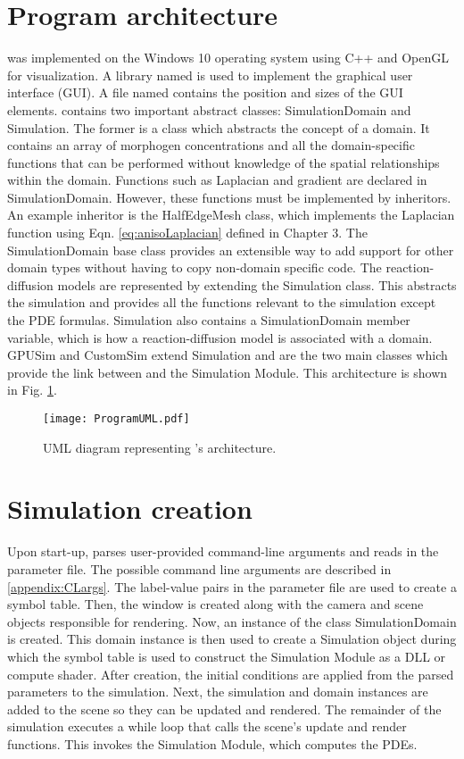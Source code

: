 \section{Program architecture} 
\ProgramName{} was implemented on the Windows 10 operating system using C++ and OpenGL for visualization. A library named  \citep{cornut2019} is used to implement the graphical user interface (GUI). A file named  contains the position and sizes of the GUI elements. \ProgramName{} contains two important abstract classes: SimulationDomain and Simulation. The former is a class which abstracts the concept of a domain. It contains an array of morphogen concentrations and all the domain-specific functions that can be performed without knowledge of the spatial relationships within the domain. Functions such as Laplacian and gradient are declared in SimulationDomain. However, these functions must be implemented by inheritors. An example inheritor is the HalfEdgeMesh class, which implements the Laplacian function using Eqn. \ref{eq:anisoLaplacian} defined in Chapter 3. The SimulationDomain base class provides an extensible way to add support for other domain types without having to copy non-domain specific code. The reaction-diffusion models are represented by extending the Simulation class. This abstracts the simulation and provides all the functions relevant to the simulation except the PDE formulas. Simulation also contains a SimulationDomain member variable, which is how a reaction-diffusion model is associated with a domain. GPUSim and CustomSim extend Simulation and are the two main classes which provide the link between \ProgramName{} and the Simulation Module. This architecture is shown in Fig. \ref{fig:umlDiagram}.

\begin{figure}[H]
	\centering
	\texttt{[image: ProgramUML.pdf]}
	\caption{UML diagram representing \ProgramName{}'s architecture.}
	\label{fig:umlDiagram}
\end{figure}

\section{Simulation creation}
Upon start-up, \ProgramName{} parses user-provided command-line arguments and reads in the parameter file. The possible command line arguments are described in \ref{appendix:CLargs}. The label-value pairs in the parameter file are used to create a symbol table. Then, the window is created along with the camera and scene objects responsible for rendering. Now, an instance of the class SimulationDomain is created. This domain instance is then used to create a Simulation object during which the symbol table is used to construct the Simulation Module as a DLL or compute shader. After creation, the initial conditions are applied from the parsed parameters to the simulation. Next, the simulation and domain instances are added to the scene so they can be updated and rendered. The remainder of the simulation executes a while loop that calls the scene's update and render functions. This invokes the Simulation Module, which computes the PDEs.

